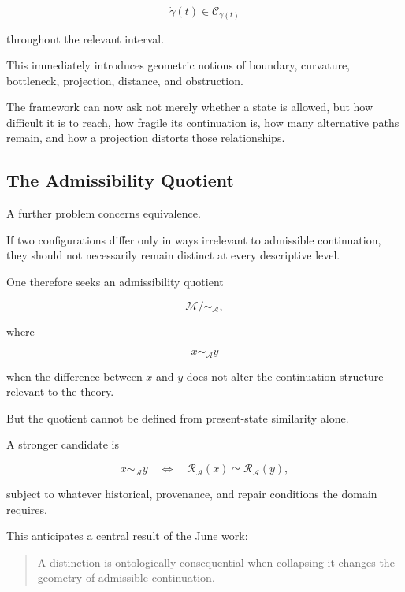 \documentclass[11pt]{article}
\theoremstyle{remark}
\newcommand{\Adm}{\mathcal{A}}
\newcommand{\Reach}{\mathcal{R}}
\begin{document}
\begin{equation}
\dot{\gamma}(t)
\in
\mathcal{C}_{\gamma(t)}
\end{equation}

throughout the relevant interval.

This immediately introduces geometric notions of boundary, curvature, bottleneck, projection, distance, and obstruction.

The framework can now ask not merely whether a state is allowed, but how difficult it is to reach, how fragile its continuation is, how many alternative paths remain, and how a projection distorts those relationships.

\subsection{The Admissibility Quotient}

A further problem concerns equivalence.

If two configurations differ only in ways irrelevant to admissible continuation, they should not necessarily remain distinct at every descriptive level.

One therefore seeks an admissibility quotient

\begin{equation}
\mathcal{M}/\!\sim_{\Adm},
\end{equation}

where

\begin{equation}
x\sim_{\Adm}y
\end{equation}

when the difference between $x$ and $y$ does not alter the continuation structure relevant to the theory.

But the quotient cannot be defined from present-state similarity alone.

A stronger candidate is

\begin{equation}
x\sim_{\Adm}y
\quad\Longleftrightarrow\quad
\Reach_{\Adm}(x)
\simeq
\Reach_{\Adm}(y),
\end{equation}

subject to whatever historical, provenance, and repair conditions the domain requires.

This anticipates a central result of the June work:

\begin{quote}
A distinction is ontologically consequential when collapsing it changes the geometry of admissible continuation.
\end{quote}
\end{document}
